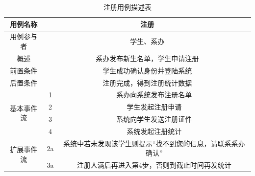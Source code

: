 \documentclass[12pt, a4paper, oneside]{ctexart}
\begin{document}
\begin{table}[H]
    \centering
    \begin{tabular}{|c|cc|}
        \hline
        用例名称                   & \multicolumn{2}{c|}{注册}                                  \\ \hline
        用例参与者                  & \multicolumn{2}{c|}{学生、系办}                               \\ \hline
        概述                     & \multicolumn{2}{c|}{系办发布新生名单，学生申请注册}                     \\ \hline
        前置条件                   & \multicolumn{2}{c|}{学生成功确认身份并登陆系统}                       \\ \hline
        后置条件                   & \multicolumn{2}{c|}{注册完成，得到注册统计数据}                       \\ \hline
        \multirow{4}{*}{基本事件流} & \multicolumn{1}{c|}{1}  & 系办向系统发布注册名单                    \\ \cline{2-3} 
                            & \multicolumn{1}{c|}{2}  & 学生发起注册申请                       \\ \cline{2-3} 
                            & \multicolumn{1}{c|}{3}  & 系统向学生发送注册证件                    \\ \cline{2-3} 
                            & \multicolumn{1}{c|}{4}  & 系统发起注册统计                    \\ \hline
        \multirow{2}{*}{扩展事件流} & \multicolumn{1}{c|}{2a} & 系统中若未发现该学生则提示“找不到您的信息，请联系系办确认” \\ \hline
                            & \multicolumn{1}{c|}{3a} & 注册人满后再进入第4步，否则到截止时间再发统计        \\ \hline
    \end{tabular}
    \caption{注册用例描述表}
\end{table}
\end{document}
